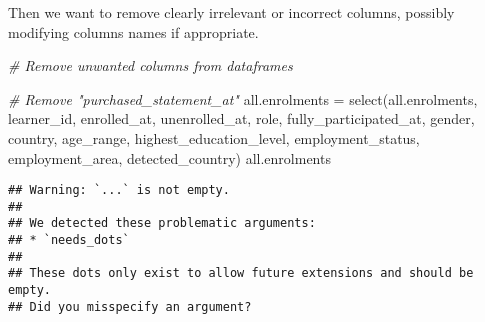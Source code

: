 \documentclass[
]{article}
\newenvironment{Shaded}{\begin{snugshade}}{\end{snugshade}}
\newcommand{\CommentTok}[1]{\textcolor[rgb]{0.56,0.35,0.01}{\textit{#1}}}
\newcommand{\FunctionTok}[1]{\textcolor[rgb]{0.00,0.00,0.00}{#1}}
\newcommand{\NormalTok}[1]{#1}
\newcommand{\OtherTok}[1]{\textcolor[rgb]{0.56,0.35,0.01}{#1}}
\begin{document}
Then we want to remove clearly irrelevant or incorrect columns, possibly
modifying columns names if appropriate.

\begin{Shaded}
\begin{Highlighting}[]
\CommentTok{\# Remove unwanted columns from dataframes}

\CommentTok{\# Remove "purchased\_statement\_at"}
\NormalTok{all.enrolments }\OtherTok{=} \FunctionTok{select}\NormalTok{(all.enrolments, learner\_id, enrolled\_at,    unenrolled\_at,  role,   fully\_participated\_at, gender,  country,    age\_range,  highest\_education\_level,    employment\_status,  employment\_area,    detected\_country)}
\NormalTok{all.enrolments}
\end{Highlighting}
\end{Shaded}

\begin{verbatim}
## Warning: `...` is not empty.
## 
## We detected these problematic arguments:
## * `needs_dots`
## 
## These dots only exist to allow future extensions and should be empty.
## Did you misspecify an argument?
\end{verbatim}
\end{document}
